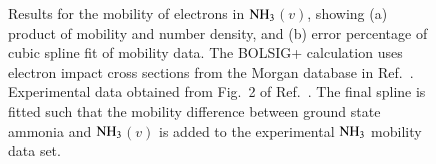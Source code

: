 \documentclass{warpdoc}
\let\citen\cite
\begin{document}
%
\begin{figure}
\centering
{}
\caption{Results for the mobility of electrons in ${\rm NH_3}$$(v)$, showing (a) product of mobility and number density, and (b) error percentage of cubic spline fit of  mobility data. The BOLSIG+ calculation uses electron impact cross sections from the Morgan database in Ref.\ \citen{jcp:2012:morgan}. Experimental data obtained from Fig.\ 2 of Ref.\ \citen{jopd:2005:lisovskiy}. The final spline is fitted such that the mobility difference between ground state ammonia and ${\rm NH_3}$$(v)$ is added to the experimental ${\rm NH_3}$ mobility data set.}
\label{fig:mobility_NH3v}
\end{figure}
\end{document}
